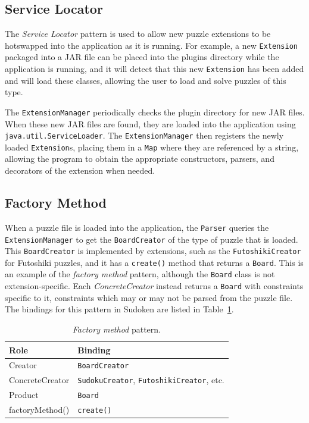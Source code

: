 \documentclass[a4paper, 11pt]{article}
\begin{document}
\subsection{Service Locator}

The \textit{Service Locator} pattern is used to allow new puzzle extensions to be hotswapped into the application as it is running. For example, a new \texttt{Extension} packaged into a JAR file can be placed into the plugins directory while the application is running, and it will detect that this new \texttt{Extension} has been added and will load these classes, allowing the user to load and solve puzzles of this type.

The \texttt{ExtensionManager} periodically checks the plugin directory for new JAR files. When these new JAR files are found, they are loaded into the application using \texttt{java.util.ServiceLoader}. The \texttt{ExtensionManager} then registers the newly loaded \texttt{Extension}s, placing them in a \texttt{Map} where they are referenced by a string, allowing the program to obtain the appropriate constructors, parsers, and decorators of the extension when needed.

\subsection{Factory Method}

When a puzzle file is loaded into the application, the \texttt{Parser} queries the \texttt{ExtensionManager} to get the \texttt{BoardCreator} of the type of puzzle that is loaded. This \texttt{BoardCreator} is implemented by extensions, such as the \texttt{FutoshikiCreator} for Futoshiki puzzles, and it has a \texttt{create()} method that returns a \texttt{Board}. This is an example of the \textit{factory method} pattern, although the \texttt{Board} class is not extension-specific. Each \textit{ConcreteCreator} instead returns a \texttt{Board} with constraints specific to it, constraints which may or may not be parsed from the puzzle file. The bindings for this pattern in Sudoken are listed in Table~\ref{table:factory}.

\begin{table}[h!]
\centering
\begin{tabular}{l l}
\textbf{Role}   & \textbf{Binding} \\ \hline
Creator         & \texttt{BoardCreator} \\
ConcreteCreator & \texttt{SudokuCreator}, \texttt{FutoshikiCreator}, etc. \\
Product         & \texttt{Board} \\
factoryMethod() & \texttt{create()} \\
\end{tabular}
\caption{\textit{Factory method} pattern.}
\label{table:factory}
\end{table}
\end{document}
